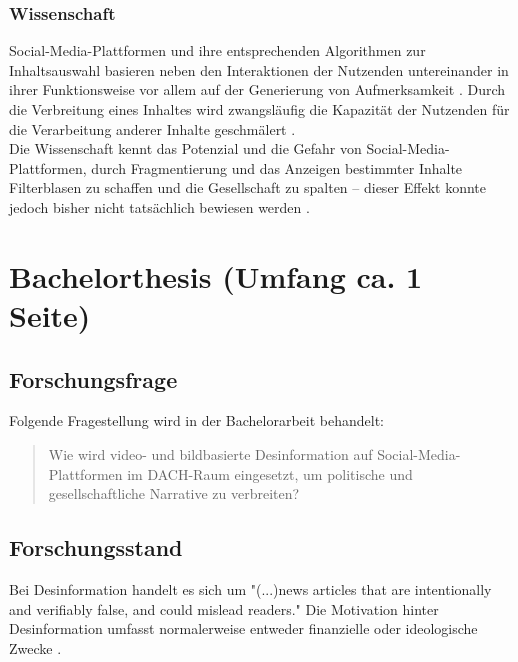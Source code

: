 \documentclass[12pt,a4paper]{article}        %
\begin{document}
\subsubsection{Wissenschaft}
Social-Media-Plattformen und ihre entsprechenden Algorithmen zur Inhaltsauswahl basieren neben den Interaktionen der Nutzenden untereinander in ihrer Funktionsweise vor allem auf der Generierung von Aufmerksamkeit \parencites[vgl.][220]{schmidt_meinungsbildung_2022}[493]{behnke_manipulation_2018}. Durch die Verbreitung eines Inhaltes wird zwangsläufig die Kapazität der Nutzenden für die Verarbeitung anderer Inhalte geschmälert \parencite[248]{hohlfeld_schlechte_2020}. \\
Die Wissenschaft kennt das Potenzial und die Gefahr von Social-Media-Plattformen, durch Fragmentierung und das Anzeigen bestimmter Inhalte Filterblasen zu schaffen und die Gesellschaft zu spalten – dieser Effekt konnte jedoch bisher nicht tatsächlich bewiesen werden \parencite[220]{schmidt_meinungsbildung_2022}.\\

\section{Bachelorthesis (Umfang ca. 1 Seite)}

\subsection{Forschungsfrage}
Folgende Fragestellung wird in der Bachelorarbeit behandelt:\\

\begin{quote}
  Wie wird video- und bildbasierte Desinformation auf Social-Media-Plattformen im DACH-Raum eingesetzt, um politische und gesellschaftliche Narrative zu verbreiten?
\end{quote}

\subsection{Forschungsstand}

Bei Desinformation handelt es sich um "(...)news articles that are intentionally and verifiably false, and could mislead readers." \parencite[213]{allcott_social_2017} Die Motivation hinter Desinformation umfasst normalerweise entweder finanzielle oder ideologische Zwecke \parencites[vgl.][138]{tandoc_defining_2018}[225]{schmidt_meinungsbildung_2022}[154-155]{lange_unsicherheit_2019}.
\end{document}
